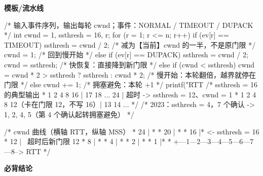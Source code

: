 \documentclass[10pt,a4paper]{ctexart}
\begin{document}
\textbf{模板/流水线}

\begin{codebox}
/* 输入事件序列，输出每轮 cwnd；事件：NORMAL / TIMEOUT / DUPACK */
int cwnd = 1, ssthresh = 16, r;
for (r = 1; r <= n; r++) {
    if (ev[r] == TIMEOUT) {
        ssthresh = cwnd / 2;      /* 减为【当前】cwnd 的一半，不是原门限 */
        cwnd = 1;                 /* 回到慢开始 */
    } else if (ev[r] == DUPACK) {
        ssthresh = cwnd / 2;
        cwnd = ssthresh;          /* 快恢复：直接降到新门限 */
    } else if (cwnd < ssthresh) {
        cwnd = cwnd * 2 > ssthresh ? ssthresh : cwnd * 2;
                                  /* 慢开始：本轮翻倍，越界就停在门限 */
    } else {
        cwnd += 1;                /* 拥塞避免：本轮 +1 */
    }
    printf("RTT %
}
/* ssthresh = 16 的典型输出
 * 1 2 4 8 16 | 17 18 ... 24 | 超时 -> ssthresh = 12、cwnd = 1
 * 1 2 4 8 12（卡在门限 12，不写 16）| 13 14 ...
 */
/* 2023：ssthresh = 4，7 个确认 -> 1, 2, 4, 5（第 4 个确认起转拥塞避免） */

/* cwnd 曲线（横轴 RTT，纵轴 MSS）
 * 24 |                              *
 * 20 |                  *
 * 16 |*        <- ssthresh = 16
 * 12 |                     \  超时后新门限 12
 *  8 |      *
 *  4 |   *
 *  2 | *
 *  1 |*
 *    +---1---2---3---4---5---6---7---8--> RTT
 */
\end{codebox}




\textbf{必背结论}
\end{document}
